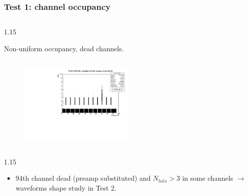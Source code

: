 \documentclass{beamer}
\begin{document}
    \begin{frame}
        \frametitle{Test 1: channel occupancy}
    \vspace{-3mm}
    \begin{columns}
    \begin{column}{1.15\framewidth}
        \setlength{\leftmargini}{1.1em}
     \begin{itemize}
     {\small
        
         \item  Non-uniform occupancy, dead channels.   }
     \end{itemize}
     \end{column}
      \end{columns}
       
         \begin{figure}[!h]
          \centering
         
          \includegraphics[width=0.5\textwidth]{figures/pdf/run105346_nh_vs_ch.pdf}
         \label{fig:normalhits}
    \end{figure}
   
     \begin{columns}
     \begin{column}{1.15\framewidth}
         \setlength{\leftmargini}{1.1em}
     \begin{itemize}
   
        \item 94th channel dead (preamp substituted) and $N_{hits}>3$ in some channels $\rightarrow$ waveforms shape study in Test 2.
        \end{itemize}
         \end{column}
    \end{columns}
    \end{frame}
\end{document}
